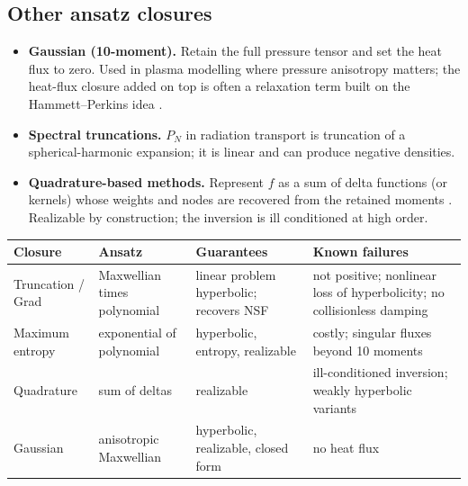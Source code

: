 \subsection{Other ansatz closures}

\begin{itemize}
  \item \textbf{Gaussian (10-moment).} Retain the full pressure tensor and
    set the heat flux to zero. Used in plasma modelling where pressure
    anisotropy matters; the heat-flux closure added on top is often a
    relaxation term built on the Hammett--Perkins idea \cite{Wang15}.
  \item \textbf{Spectral truncations.} $P_N$ in radiation transport is
    truncation of a spherical-harmonic expansion; it is linear and can
    produce negative densities.
  \item \textbf{Quadrature-based methods.} Represent $f$ as a sum of delta
    functions (or kernels) whose weights and nodes are recovered from the
    retained moments \cite{McGraw97}. Realizable by construction; the
    inversion is ill conditioned at high order.
\end{itemize}

\begin{center}
\renewcommand{\arraystretch}{1.25}
\begin{tabularx}{\textwidth}{@{}P{2.9cm}P{3.5cm}YY@{}}
\toprule
Closure & Ansatz & Guarantees & Known failures \\
\midrule
Truncation / Grad & Maxwellian times polynomial
  & linear problem hyperbolic; recovers NSF
  & not positive; nonlinear loss of hyperbolicity; no collisionless damping \\
Maximum entropy & exponential of polynomial
  & hyperbolic, entropy, realizable
  & costly; singular fluxes beyond 10 moments \\
Quadrature & sum of deltas
  & realizable
  & ill-conditioned inversion; weakly hyperbolic variants \\
Gaussian & anisotropic Maxwellian
  & hyperbolic, realizable, closed form
  & no heat flux \\
\bottomrule
\end{tabularx}
\end{center}
